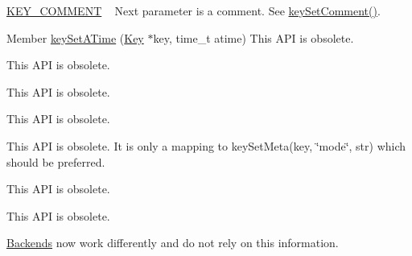 \begin{DoxyRefList}
\begin{DoxyItemize}
\item \hyperlink{group__key_gga91fb3178848bd682000958089abbaf40ac29427bb47cc31689d02912e36161ee3}{K\+E\+Y\+\_\+\+C\+O\+M\+M\+E\+NT} ~\newline
 Next parameter is a comment. See \hyperlink{group__meta_ga8863a877a84fa46e6017fe72e49b89c1}{key\+Set\+Comment()}. 
\begin{DoxyCodeInclude}
\end{DoxyCodeInclude}
Member \hyperlink{group__meta_ga995d8b84731673c88c7c01f3fed538b9}{key\+Set\+A\+Time} (\hyperlink{classkdb_1_1Key}{Key} $\ast$key, time\+\_\+t atime) This A\+PI is obsolete. 
\end{DoxyItemize}
\item[\label{deprecated__deprecated000025}%
\Hypertarget{deprecated__deprecated000025}%
Member \hyperlink{group__meta_ga9f502ecab8ab43f0b17220fcc95f3fa5}{key\+Set\+C\+Time} (\hyperlink{classkdb_1_1Key}{Key} $\ast$key, time\+\_\+t ctime)]This A\+PI is obsolete. 
\item[\label{deprecated__deprecated000017}%
\Hypertarget{deprecated__deprecated000017}%
Member \hyperlink{group__meta_gaae575bd86a628a15ee45baa860522e75}{key\+Set\+Dir} (\hyperlink{classkdb_1_1Key}{Key} $\ast$key)]This A\+PI is obsolete. 
\item[\label{deprecated__deprecated000016}%
\Hypertarget{deprecated__deprecated000016}%
Member \hyperlink{group__meta_ga9e3d0fb3f7ba906e067727b9155d22e3}{key\+Set\+G\+ID} (\hyperlink{classkdb_1_1Key}{Key} $\ast$key, gid\+\_\+t gid)]This A\+PI is obsolete. 
\item[\label{deprecated__deprecated000019}%
\Hypertarget{deprecated__deprecated000019}%
Member \hyperlink{group__meta_ga8803037e35b9da1ce492323a88ff6bc3}{key\+Set\+Mode} (\hyperlink{classkdb_1_1Key}{Key} $\ast$key, mode\+\_\+t mode)]This A\+PI is obsolete. It is only a mapping to key\+Set\+Meta(key, \char`\"{}mode\char`\"{}, str) which should be preferred. 
\item[\label{deprecated__deprecated000023}%
\Hypertarget{deprecated__deprecated000023}%
Member \hyperlink{group__meta_ga481d8997187992fe4bbf288bc8ef4db7}{key\+Set\+M\+Time} (\hyperlink{classkdb_1_1Key}{Key} $\ast$key, time\+\_\+t mtime)]This A\+PI is obsolete. 
\item[\label{deprecated__deprecated000014}%
\Hypertarget{deprecated__deprecated000014}%
Member \hyperlink{group__meta_gab5f284f5ecd261e0a290095f50ba1af7}{key\+Set\+U\+ID} (\hyperlink{classkdb_1_1Key}{Key} $\ast$key, uid\+\_\+t uid)]This A\+PI is obsolete. 
\item[\label{deprecated__deprecated000011}%
\Hypertarget{deprecated__deprecated000011}%
Member \hyperlink{group__keyset_ga8f210432e664d8ba06d7d55a2aba2d0f}{ks\+Need\+Sync} (const \hyperlink{classkdb_1_1KeySet}{Key\+Set} $\ast$ks)]\hyperlink{classkdb_1_1tools_1_1Backends}{Backends} now work differently and do not rely on this information.
\end{DoxyRefList}